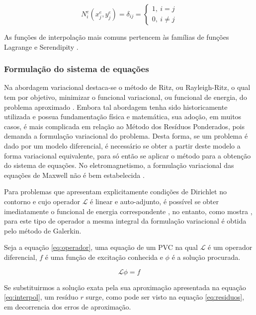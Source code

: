 \documentclass[
    12pt,               %
    openright,          %
    oneside,
    a4paper,            %
    english,            %
    french,             %
    spanish,            %
    brazil              %
    ]{abntex2}
\begin{document}
\begin{equation}
\label{eq:kron}
N_i^e(x^e_j, y^e_j) = \delta_{ij} = \begin{cases}
1, \ i = j\\
0, \ i \neq j
\end{cases}
\end{equation}

As funções de interpolação mais comuns pertencem às famílias de funções Lagrange e Serendipity \cite{zien, volakis}.

\subsubsection*{Formulação do sistema de equações}
Na abordagem variacional destaca-se o método de Ritz, ou Rayleigh-Ritz, o qual tem por objetivo, minimizar o funcional variacional, ou funcional de energia, do problema aproximado \cite{volakis}. Embora tal abordagem tenha sido historicamente utilizada e possua fundamentação física e matemática, sua adoção, em muitos casos, é mais complicada em relação ao Método dos Resíduos Ponderados, pois demanda a formulação variacional do problema. Desta forma, se um problema é dado por um modelo diferencial, é necessário se obter a partir deste modelo a forma variacional equivalente, para só então se aplicar o método para a obtenção do sistema de equações. No eletromagnetismo, a formulação variacional das equações de Maxwell não é bem estabelecida \cite{jin}.

Para problemas que apresentam explicitamente condições de Dirichlet no contorno e cujo operador $\mathcal{L}$ é linear e auto-adjunto, é possível se obter imediatamente o funcional de energia correspondente \cite{zien}, no entanto, como mostra \cite[p. 29]{volakis}, para este tipo de operador a mesma integral da formulação variacional é obtida pelo método de Galerkin.


Seja a equação \ref{eq:operador}, uma equação de um PVC na qual $\mathcal{L}$ é um operador diferencial, $f$ é uma função de excitação conhecida e $\phi$ é a solução procurada.

\begin{equation}
\label{eq:operador}
\mathcal{L} \phi = f
\end{equation}

Se substituirmos a solução exata pela sua aproximação apresentada na equação \ref{eq:interpol}, um resíduo $r$ surge, como pode ser visto na equação \ref{eq:residuos}, em decorrencia dos erros de aproximação.
\end{document}
